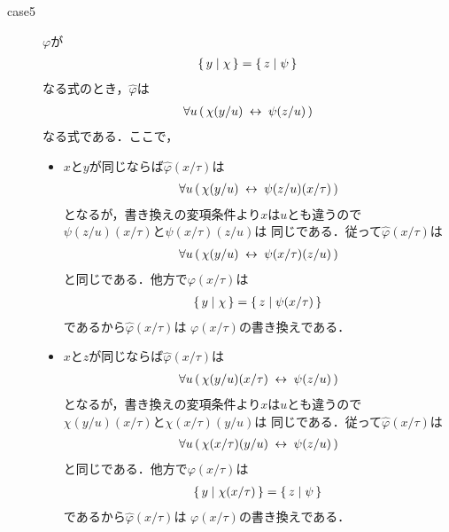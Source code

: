 \begin{metaprf}
\begin{description}
\begin{description}
					\item[case5] $\varphi$が
						\begin{align}
							\{\, y \mid \chi\, \} = \{\, z \mid \psi\, \}
						\end{align}
						なる式のとき，$\widehat{\varphi}$は
						\begin{align}
							\forall u\, (\, \chi(y/u) \hspace{0.25em}\leftrightarrow\hspace{0.25em} \psi(z/u)\, )
						\end{align}
						なる式である．ここで，
						\begin{itemize}
							\item $x$と$y$が同じならば$\widehat{\varphi}(x/\tau)$は
								\begin{align}
									\forall u\, (\, \chi(y/u) \hspace{0.25em}\leftrightarrow\hspace{0.25em} \psi(z/u)(x/\tau)\, )
								\end{align}
								となるが，書き換えの変項条件より$x$は$u$とも違うので
								$\psi(z/u)(x/\tau)$と$\psi(x/\tau)(z/u)$は
								同じである．従って$\widehat{\varphi}(x/\tau)$は
								\begin{align}
									\forall u\, (\, \chi(y/u) \hspace{0.25em}\leftrightarrow\hspace{0.25em} \psi(x/\tau)(z/u)\, )
								\end{align}
								と同じである．他方で$\varphi(x/\tau)$は
								\begin{align}
									\{\, y \mid \chi\, \} = \{\, z \mid \psi(x/\tau)\, \}
								\end{align}
								であるから$\widehat{\varphi}(x/\tau)$は
								$\varphi(x/\tau)$の書き換えである．
								
							\item $x$と$z$が同じならば$\widehat{\varphi}(x/\tau)$は
								\begin{align}
									\forall u\, (\, \chi(y/u)(x/\tau) \hspace{0.25em}\leftrightarrow\hspace{0.25em} \psi(z/u)\, )
								\end{align}
								となるが，書き換えの変項条件より$x$は$u$とも違うので
								$\chi(y/u)(x/\tau)$と$\chi(x/\tau)(y/u)$は
								同じである．従って$\widehat{\varphi}(x/\tau)$は
								\begin{align}
									\forall u\, (\, \chi(x/\tau)(y/u) \hspace{0.25em}\leftrightarrow\hspace{0.25em} \psi(z/u)\, )
								\end{align}
								と同じである．他方で$\varphi(x/\tau)$は
								\begin{align}
									\{\, y \mid \chi(x/\tau)\, \} = \{\, z \mid \psi\, \}
								\end{align}
								であるから$\widehat{\varphi}(x/\tau)$は
								$\varphi(x/\tau)$の書き換えである．
							

\end{itemize}
\end{description}
\end{description}
\end{metaprf}
